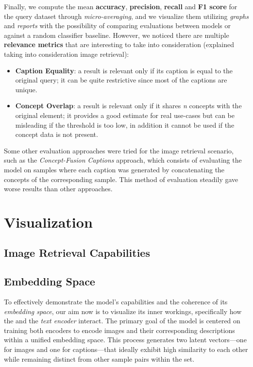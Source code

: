 \documentclass[12pt, a4paper]{article}
\begin{document}
Finally, we compute the mean \textbf{accuracy}, \textbf{precision}, \textbf{recall} and \textbf{F1 score} for the query dataset through \textit{micro-averaging}, and we visualize them utilizing \textit{graphs} and \textit{reports} with the possibility of comparing evaluations between models or against a random classifier baseline.
However, we noticed there are multiple \textbf{relevance metrics} that are interesting to take into consideration (explained taking into consideration image retrieval):
\begin{itemize}
    \item \textbf{Caption Equality}: a result is relevant only if its caption is equal to the original query; it can be quite restrictive since most of the captions are unique.
    \item \textbf{Concept Overlap}: a result is relevant only if it shares \textit{n} concepts with the original element; it provides a good estimate for real use-cases but can be misleading if the threshold is too low, in addition it cannot be used if the concept data is not present.
\end{itemize}

Some other evaluation approaches were tried for the image retrieval scenario, such as the \textit{Concept-Fusion Captions} approach, which consists of evaluating the model on samples where each caption was generated by concatenating the concepts of the corresponding sample.
This method of evaluation steadily gave worse results than other approaches.

\section{Visualization}

\subsection{Image Retrieval Capabilities}

\subsection{Embedding Space}

To effectively demonstrate the model's capabilities and the coherence of its \textit{embedding space}, our aim now is to visualize its inner workings, specifically how the  and the \textit{text encoder} interact. The primary goal of the model is centered on training both encoders to encode images and their corresponding descriptions within a unified embedding space. This process generates two latent vectors—one for images and one for captions—that ideally exhibit high similarity to each other while remaining distinct from other sample pairs within the set.
\end{document}
